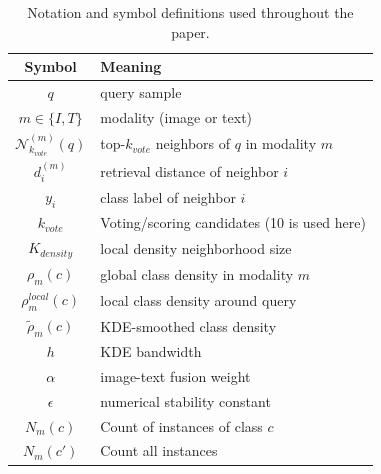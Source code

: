 \documentclass{article}
\begin{document}
\begin{appendices}
\begin{table}[!htb]
\centering
\begin{tabular}{|c|l|}
\hline
\textbf{Symbol} & \textbf{Meaning} \\
\hline
$q$ & query sample \\
\hline
$m \in \{I, T\}$ & modality (image or text) \\
\hline
$\mathcal{N}^{(m)}_{k_{vote}}(q)$ & top-$k_{vote}$ neighbors of $q$ in modality $m$ \\
\hline
$d_i^{(m)}$ & retrieval distance of neighbor $i$ \\
\hline
$y_i$ & class label of neighbor $i$ \\
\hline
$k_{vote}$ & Voting/scoring candidates (10 is used here) \\
\hline
$K_{density}$ & local density neighborhood size \\
\hline
$\rho_m(c)$ & global class density in modality $m$ \\
\hline
$\rho_m^{local}(c)$ & local class density around query \\
\hline
$\tilde{\rho}_m(c)$ & KDE-smoothed class density \\
\hline
$h$ & KDE bandwidth \\
\hline
$\alpha$ & image-text fusion weight \\
\hline
$\epsilon$ & numerical stability constant \\
\hline
$N_m(c)$ & Count of instances of class $c$ \\
\hline
$N_m(c')$ & Count all instances \\
\hline
\end{tabular}
\caption{Notation and symbol definitions used throughout the paper.}
\label{tab:notation}
\end{table}

\begin{table}[!htb]
\centering
{}
\caption{Comparison between tuned $\alpha$ (T) and not tuned $\alpha$ (NT) for RAC variants}
\label{tab:verified_tuned_vs_noalpha}
\end{table}


\end{appendices}
\end{document}
